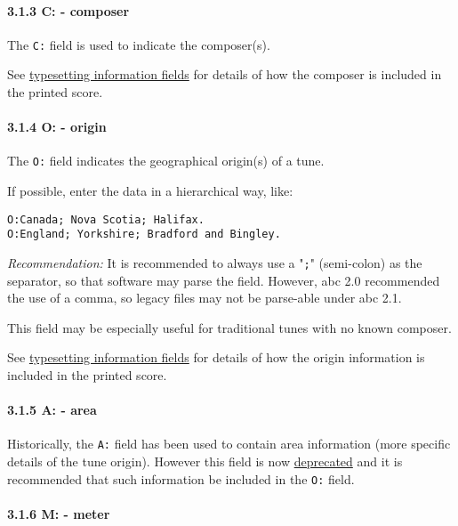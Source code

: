\hypertarget{ccomposer}{\paragraph{3.1.3 C: -
composer}\label{ccomposer}}

The \texttt{C:} field is used to indicate the composer(s).

See \protect\hyperlink{typesetting_information_fields}{typesetting
information fields} for details of how the composer is included in the
printed score.

\hypertarget{oorigin}{\paragraph{3.1.4 O: - origin}\label{oorigin}}

The \texttt{O:} field indicates the geographical origin(s) of a tune.

If possible, enter the data in a hierarchical way, like:

\begin{verbatim}
O:Canada; Nova Scotia; Halifax.
O:England; Yorkshire; Bradford and Bingley.
\end{verbatim}

\emph{Recommendation:} It is recommended to always use a "\texttt{;}"
(semi-colon) as the separator, so that software may parse the field.
However, abc 2.0 recommended the use of a comma, so legacy files may not
be parse-able under abc 2.1.

This field may be especially useful for traditional tunes with no known
composer.

See \protect\hyperlink{typesetting_information_fields}{typesetting
information fields} for details of how the origin information is
included in the printed score.

\hypertarget{aarea}{\paragraph{3.1.5 A: - area}\label{aarea}}

Historically, the \texttt{A:} field has been used to contain area
information (more specific details of the tune origin). However this
field is now \protect\hyperlink{outdated_syntax}{deprecated} and it is
recommended that such information be included in the \texttt{O:} field.

\hypertarget{mmeter}{\paragraph{3.1.6 M: - meter}\label{mmeter}}

